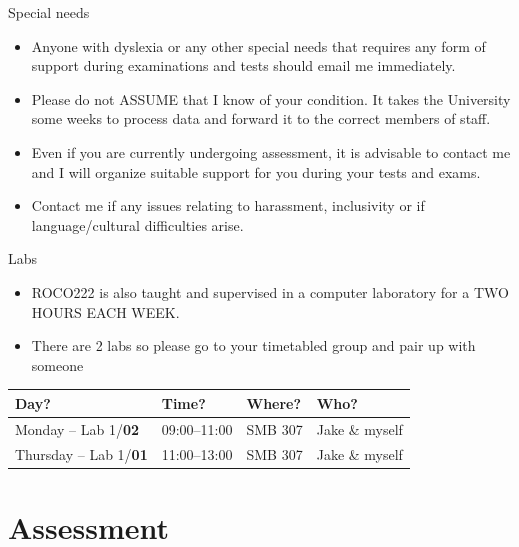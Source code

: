 \documentclass[compress]{beamer}
\begin{document}
\begin{frame}{Special needs}

    \begin{itemize}

    \item Anyone with dyslexia or any other special needs that requires any form
        of support during examinations and tests should email me immediately.

    \item Please do not ASSUME that I know of your condition. It takes the
        University some weeks to process data and forward it to the correct
            members of staff.

    \item Even if you are currently undergoing assessment, it is advisable to
        contact me and I will organize suitable support for you during your
            tests and exams.

    \item Contact me if any issues relating to harassment, inclusivity or if
        language/cultural difficulties arise.

    \end{itemize}
\end{frame}

\begin{frame}{Labs}
    \begin{itemize}
        \item ROCO222 is also taught and supervised in a computer laboratory for
            a TWO HOURS EACH WEEK.
        \item There are 2 labs so please go to your timetabled group and pair up
            with someone
    \end{itemize}

    \centering
          \begin{tabular}{@{}llll@{}}
                \toprule
                Day?                & Time? & Where?   & Who? \\ \midrule
                Monday -- Lab 1/\textbf{02} & 09:00--11:00     & SMB 307  & Jake \& myself            \\
                Thursday -- Lab 1/\textbf{01} & 11:00--13:00     & SMB 307  & Jake \& myself          \\ \bottomrule
            \end{tabular}


\end{frame}

\section{Assessment}
\end{document}
